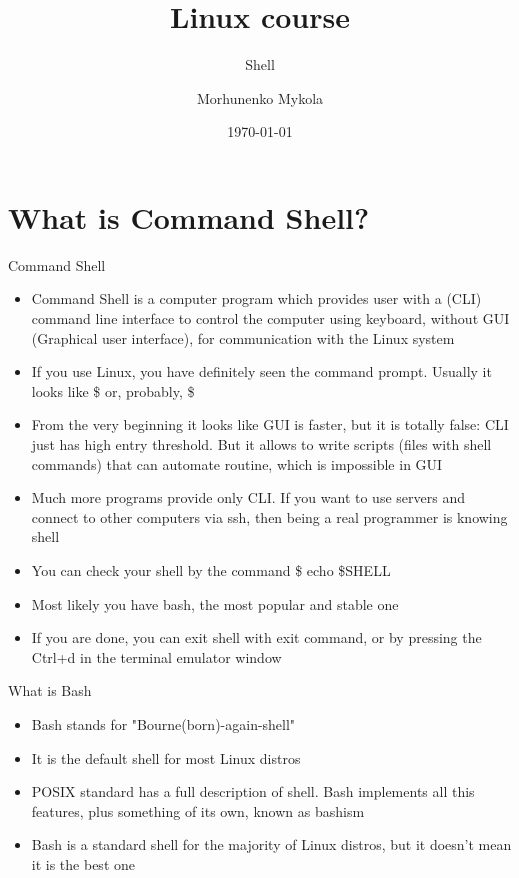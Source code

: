 \documentclass[usenames,dvipsnames,10pt,aspectratio=169]{beamer}
\title{Linux course}
\subtitle{Shell}
\date[\today]{\small\today}
\author[Morhunenko Mykola]{Morhunenko Mykola}
\institute{APPS@UCU}
\begin{document}
\begin{frame}
\titlepage
\end{frame}

\begin{frame}{\contentsname}
\tableofcontents
\end{frame}

\section{What is Command Shell?}

\begin{frame}{Command Shell}
\begin{itemize}
    \item Command Shell is a computer program which provides user with a (CLI) command line interface to control the computer using keyboard, without GUI (Graphical user interface), for communication with the Linux system
    \item If you use Linux, you have definitely seen the command prompt. Usually it looks like {\color{ucugreen}\$} or, probably, {\color{ucugreen} \$}
    \item From the very beginning it looks like GUI is faster, but it is totally false: CLI just has high entry threshold. But it allows to write scripts (files with shell commands) that can automate routine, which is impossible in GUI
    \item Much more programs provide only CLI. If you want to use servers and connect to other computers via ssh, then being a real programmer is knowing shell
    \item You can check your shell by the command {\color{ucugreen} \$ echo \$SHELL}
    \item Most likely you have {\color{ucugreen} bash}, the most popular and stable one
    \item If you are done, you can exit shell with {\color{ucugreen} exit} command, or by pressing the {\color{ucugreen}Ctrl+d} in the terminal emulator window
\end{itemize}
\end{frame}

\begin{frame}{What is Bash}
\begin{itemize}
    \item Bash stands for "Bourne(born)-again-shell"
    \item It is the default shell for most Linux distros
    \item POSIX standard has a full description of shell. Bash implements all this features, plus something of its own, known as {\color{ucugreen} bashism}
    \item Bash is a standard shell for the majority of Linux distros, but it doesn't mean it is the best one
\end{itemize}
\end{frame}
\end{document}
